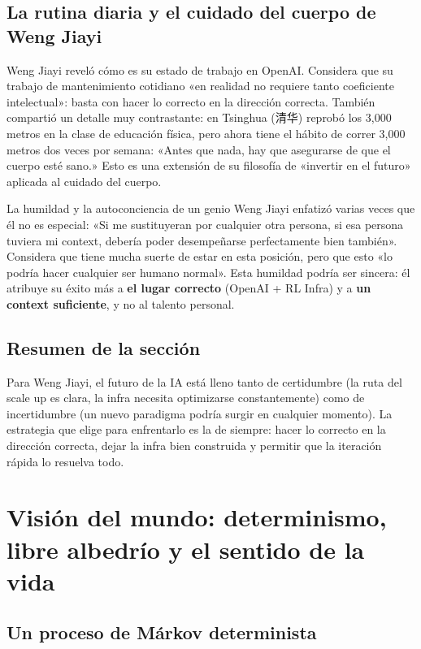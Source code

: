 \documentclass[a4paper]{article}
\begin{document}
\subsection{La rutina diaria y el cuidado del cuerpo de Weng Jiayi}

Weng Jiayi reveló cómo es su estado de trabajo en OpenAI. Considera que su trabajo de mantenimiento cotidiano «en realidad no requiere tanto coeficiente intelectual»: basta con hacer lo correcto en la dirección correcta. También compartió un detalle muy contrastante: en Tsinghua (清华) reprobó los 3,000 metros en la clase de educación física, pero ahora tiene el hábito de correr 3,000 metros dos veces por semana: «Antes que nada, hay que asegurarse de que el cuerpo esté sano.» Esto es una extensión de su filosofía de «invertir en el futuro» aplicada al cuidado del cuerpo.

\begin{warningbox}{La humildad y la autoconciencia de un genio}
Weng Jiayi enfatizó varias veces que él no es especial: «Si me sustituyeran por cualquier otra persona, si esa persona tuviera mi context, debería poder desempeñarse perfectamente bien también». Considera que tiene mucha suerte de estar en esta posición, pero que esto «lo podría hacer cualquier ser humano normal». Esta humildad podría ser sincera: él atribuye su éxito más a \textbf{el lugar correcto} (OpenAI + RL Infra) y a \textbf{un context suficiente}, y no al talento personal.
\end{warningbox}

\subsection{Resumen de la sección}

Para Weng Jiayi, el futuro de la IA está lleno tanto de certidumbre (la ruta del scale up es clara, la infra necesita optimizarse constantemente) como de incertidumbre (un nuevo paradigma podría surgir en cualquier momento). La estrategia que elige para enfrentarlo es la de siempre: hacer lo correcto en la dirección correcta, dejar la infra bien construida y permitir que la iteración rápida lo resuelva todo.

\section{Visión del mundo: determinismo, libre albedrío y el sentido de la vida}

\subsection{Un proceso de Márkov determinista}
\end{document}
